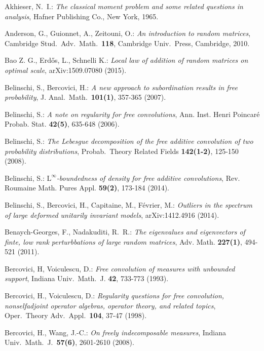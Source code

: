 \documentclass[10pt,reqno]{amsart}
\numberwithin{equation}{section}
\theoremstyle{plain}
\numberwithin{kevin}{section}
\theoremstyle{remark}
\begin{document}
\begin{thebibliography}{00}

 Akhieser, N.\ I.: \emph{The classical moment problem and some related questions in analysis}, Hafner Publishing Co., New York, 1965.

  Anderson, G., Guionnet, A., Zeitouni, O.: \emph{An introduction to random matrices}, Cambridge Stud.\ Adv.\ Math.\ {\bf 118}, Cambridge Univ.\ Press, Cambridge, 2010.

 Bao Z. G., Erd\H{o}s, L., Schnelli K.: \emph{Local law of addition of random matrices on optimal scale}, arXiv:1509.07080 (2015).

Belinschi, S., Bercovici, H.: \emph{A new approach to subordination results in free probability}, J. Anal.\ Math.\ \textbf{101(1)}, 357-365 (2007). 

 Belinschi, S.: \emph{A note on regularity for free convolutions}, Ann. Inst. Henri Poincar\'{e} Probab. Stat. \textbf{42(5)}, 635-648 (2006).

 Belinschi, S.: \emph{The Lebesgue decomposition of the free additive convolution of two probability distributions}, Probab.\ Theory Related Fields \textbf{142(1-2)}, 125-150  (2008).

 Belinschi, S.: \emph{$\mathrm{L}^{\infty}$-boundedness of density for free additive convolutions}, Rev. Roumaine Math. Pures Appl. \textbf{59(2)}, 173-184 (2014). 

 Belinschi, S.,  Bercovici, H., Capitaine, M., F\'{e}vrier, M.: \emph{Outliers in the spectrum of large deformed unitarily invariant models}, arXiv:1412.4916 (2014).


 Benaych-Georges, F., Nadakuditi, R.\ R.: \emph{The eigenvalues and eigenvectors of finte, low rank perturbbations of large random matrices}, Adv. Math. \textbf{227(1)}, 494-521 (2011).

 Bercovici, H, Voiculescu, D.: \emph{Free convolution of measures with unbounded
support}, Indiana Univ.\ Math.~J. \textbf{42}, 733-773 (1993).

 Bercovici, H., Voiculescu, D.: \emph{Regularity questions for free convolution, nonselfadjoint operator algebras, operator theory, and related topics}, Oper.\ Theory Adv.\ Appl.\ \textbf{104}, 37-47 (1998).

 Bercovici, H., Wang, J.-C.: \emph{On freely indecomposable measures}, Indiana Univ.\ Math.\ J.\ \textbf{57(6)}, 2601-2610  (2008).


\end{thebibliography}
\end{document}
